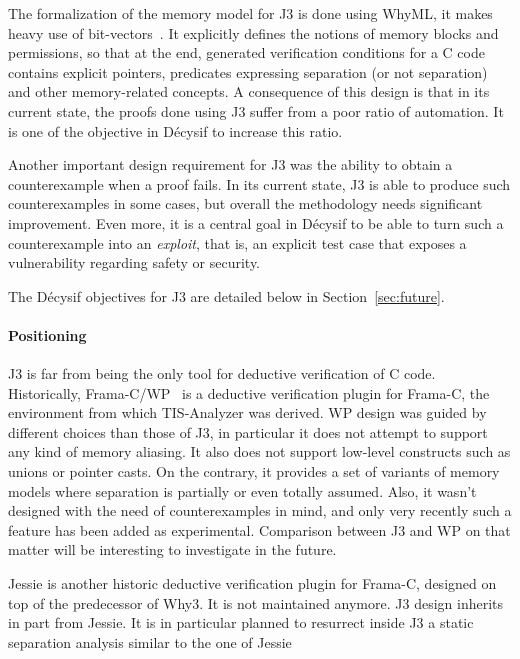 \documentclass[a4paper,11pt]{article}
\begin{document}
The formalization of the memory model for J3 is done using WhyML, it makes heavy
use of bit-vectors~\cite{fumex16nfm}. It explicitly defines the notions of memory
blocks and permissions, so that at the end, generated verification conditions
for a C code contains explicit pointers, predicates expressing separation (or
not separation) and other memory-related concepts. A consequence of this design
is that in its current state, the proofs done using J3 suffer from a poor ratio
of automation. It is one of the objective in Décysif to increase this ratio.

Another important design requirement for J3 was the ability to obtain a counterexample
when a proof fails. In its current state, J3 is able to produce such
counterexamples in some cases, but overall the methodology needs significant
improvement. Even more, it is a central goal in Décysif to be able to turn such
a counterexample into an \emph{exploit}, that is, an explicit test case that
exposes a vulnerability regarding safety or security.

The Décysif objectives for J3 are detailed below in Section~\ref{sec:future}.

\paragraph{Positioning}

J3 is far from being the only tool for deductive verification of C
code. Historically, Frama-C/WP~\cite{blanchard2024wp} is a deductive
verification plugin for Frama-C, the environment from which TIS-Analyzer was
derived. WP design was guided by different choices than those of J3, in
particular it does not attempt to support any kind of memory aliasing.
It also does not support low-level constructs such as unions or pointer casts. On the
contrary, it provides a set of variants of memory models where separation is
partially or even totally assumed. Also, it wasn't designed with the need of
counterexamples in mind, and only very recently such a feature has been added as
experimental. Comparison between J3 and WP on that matter will be interesting to
investigate in the future.

Jessie is another historic deductive verification plugin for Frama-C, designed
on top of the predecessor of Why3. It is not maintained anymore. J3 design
inherits in part from Jessie. It is in particular planned to resurrect inside J3 a
static separation analysis similar to the one of
Jessie~\cite{hubert2008these,hubert07hav}
\end{document}

